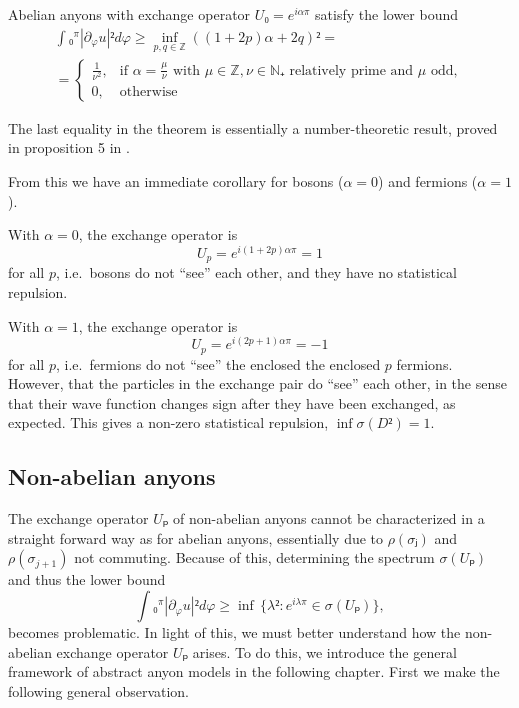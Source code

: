 \begin{theorem}
  Abelian anyons with exchange operator $U₀ = e^{iαπ}$ satisfy the lower bound
  \begin{equation}
    \begin{gathered}
      ∫₀^π |∂_φu|² dφ ≥ \inf_{p,q ∈ ℤ} \left( (1+2p)α + 2q \right)² = \\
      = \begin{cases}
        \frac{1}{ν^2}, & \text{if $α = \frac{μ}{ν}$ with $μ ∈ ℤ, ν ∈ ℕ₊$ relatively prime and $μ$ odd}, \\
        0, & \text{otherwise}
      \end{cases}
    \end{gathered}
  \end{equation}
\end{theorem}

The last equality in the theorem is essentially a number-theoretic result, proved in proposition 5 in \cite{lundholm-solovej}.

From this we have an immediate corollary for bosons ($α = 0$) and fermions ($α = 1$).

\begin{corollary}
  With $α = 0$, the exchange operator is
  \begin{equation}
    U_p = e^{i(1+2p)απ} = 1
  \end{equation}
  for all $p$, i.e.\ bosons do not ``see'' each other, and they have no statistical repulsion.

  With $α = 1$, the exchange operator is
  \begin{equation}
    U_p = e^{i(2p+1)απ} = -1
  \end{equation}
  for all $p$, i.e.\ fermions do not ``see'' the enclosed the enclosed $p$ fermions. However, that the particles in the exchange pair do ``see'' each other, in the sense that their wave function changes sign after they have been exchanged, as expected. This gives a non-zero statistical repulsion, $\inf σ(D²) = 1$.
\end{corollary}








\subsection{Non-abelian anyons}

The exchange operator $Uₚ$ of non-abelian anyons cannot be characterized in a straight forward way as for abelian anyons, essentially due to $ρ(σⱼ)$ and $ρ(σ_{j+1})$ not commuting. Because of this, determining the spectrum $σ(Uₚ)$ and thus the lower bound
\begin{equation}
    ∫₀^π |∂_φu|² dφ ≥ \inf \, \{ λ² : e^{iλπ} ∈ σ(Uₚ) \},
\end{equation}
becomes problematic. In light of this, we must better understand how the non-abelian exchange operator $Uₚ$ arises. To do this, we introduce the general framework of abstract anyon models in the following chapter. First we make the following general observation.

